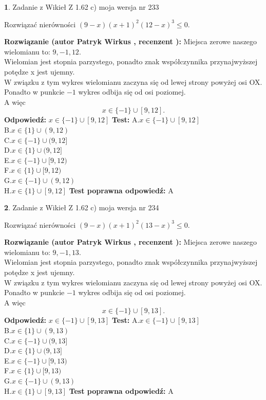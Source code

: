 \documentclass[12pt, a4paper]{article}
\theoremstyle{definition} %
\newtheorem{zad}{}
\newcommand{\zadStart}[1]{\begin{zad}#1\newline}
\newcommand{\zadStop}{\end{zad}}
\newcommand{\rozwStart}[2]{\noindent \textbf{Rozwiązanie (autor #1 , recenzent #2): }\newline}
\newcommand{\rozwStop}{\newline}
\newcommand{\odpStart}{\noindent \textbf{Odpowiedź:}\newline}
\newcommand{\odpStop}{\newline}
\newcommand{\testStart}{\noindent \textbf{Test:}\newline}
\newcommand{\testStop}{\newline}
\newcommand{\kluczStart}{\noindent \textbf{Test poprawna odpowiedź:}\newline}
\newcommand{\kluczStop}{\newline}
\begin{document}
\zadStart{Zadanie z Wikieł Z 1.62 c) moja wersja nr 233}

Rozwiązać nierówności $(9-x)(x+1)^{2}(12-x)^{3}\le0$.
\zadStop
\rozwStart{Patryk Wirkus}{}
Miejsca zerowe naszego wielomianu to: $9, -1, 12$.\\
Wielomian jest stopnia parzystego, ponadto znak współczynnika przy\linebreak najwyższej potędze x jest ujemny.\\ W związku z tym wykres wielomianu zaczyna się od lewej strony powyżej osi OX.\\
Ponadto w punkcie $-1$ wykres odbija się od osi poziomej.\\
A więc $$x \in \{-1\} \cup [9,12].$$
\rozwStop
\odpStart
$x \in \{-1\} \cup [9,12]$
\odpStop
\testStart
A.$x \in \{-1\} \cup [9,12]$\\
B.$x \in \{1\} \cup (9,12)$\\
C.$x \in \{-1\} \cup (9,12]$\\
D.$x \in \{1\} \cup (9,12]$\\
E.$x \in \{-1\} \cup [9,12)$\\
F.$x \in \{1\} \cup [9,12)$\\
G.$x \in \{-1\} \cup (9,12)$\\
H.$x \in \{1\} \cup [9,12]$
\testStop
\kluczStart
A
\kluczStop



\zadStart{Zadanie z Wikieł Z 1.62 c) moja wersja nr 234}

Rozwiązać nierówności $(9-x)(x+1)^{2}(13-x)^{3}\le0$.
\zadStop
\rozwStart{Patryk Wirkus}{}
Miejsca zerowe naszego wielomianu to: $9, -1, 13$.\\
Wielomian jest stopnia parzystego, ponadto znak współczynnika przy\linebreak najwyższej potędze x jest ujemny.\\ W związku z tym wykres wielomianu zaczyna się od lewej strony powyżej osi OX.\\
Ponadto w punkcie $-1$ wykres odbija się od osi poziomej.\\
A więc $$x \in \{-1\} \cup [9,13].$$
\rozwStop
\odpStart
$x \in \{-1\} \cup [9,13]$
\odpStop
\testStart
A.$x \in \{-1\} \cup [9,13]$\\
B.$x \in \{1\} \cup (9,13)$\\
C.$x \in \{-1\} \cup (9,13]$\\
D.$x \in \{1\} \cup (9,13]$\\
E.$x \in \{-1\} \cup [9,13)$\\
F.$x \in \{1\} \cup [9,13)$\\
G.$x \in \{-1\} \cup (9,13)$\\
H.$x \in \{1\} \cup [9,13]$
\testStop
\kluczStart
A
\kluczStop
\end{document}
